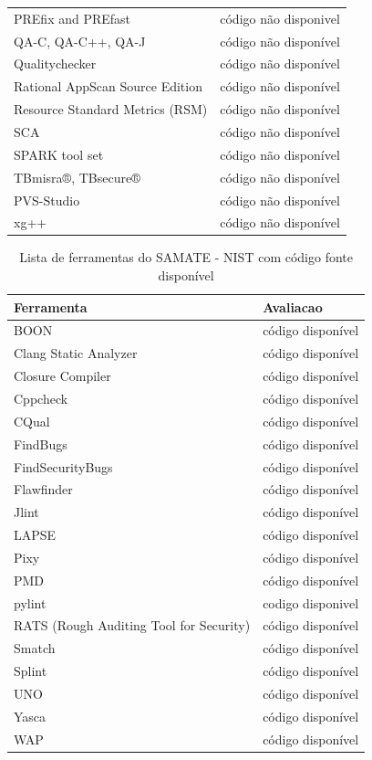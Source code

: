 \documentclass[12pt]{article}
\begin{document}
\begin{table}
\begin{tabular}{| l | l |}
PREfix and PREfast        & código não disponivel \\
QA-C, QA-C++, QA-J        & código não disponível \\
Qualitychecker            & código não disponível \\
Rational AppScan Source Edition & código não disponível \\
Resource Standard Metrics (RSM) & código não disponível \\
SCA                       & código não disponível \\
SPARK tool set            & código não disponível \\
TBmisra®, TBsecure®       & código não disponível \\
PVS-Studio                & código não disponível \\
xg++                      & código não disponível \\
\hline
\end{tabular}
\label{ferramentas-do-nist-sem-codigo}
\end{table}

\begin{table}
\caption{Lista de ferramentas do SAMATE - NIST com código fonte disponível}
\centering
\begin{tabular}{| l | l |}
\hline
Ferramenta & Avaliacao  \\
\hline
BOON                      & código disponível \\
Clang Static Analyzer     & código disponível \\
Closure Compiler          & código disponível \\
Cppcheck                  & código disponível \\
CQual                     & código disponível \\
FindBugs                  & código disponível \\
FindSecurityBugs          & código disponível \\
Flawfinder                & código disponível \\
Jlint                     & código disponível \\
LAPSE                     & código disponível \\
Pixy                      & código disponível \\
PMD                       & código disponível \\
pylint                    & codigo disponivel \\
RATS (Rough Auditing Tool for Security) & código disponível \\
Smatch                    & código disponível \\
Splint                    & código disponível \\
UNO                       & código disponível \\
Yasca                     & código disponível \\
WAP                       & código disponível \\
\hline
\end{tabular}
\label{ferramentas-do-nist-com-codigo}
\end{table}
\end{document}
